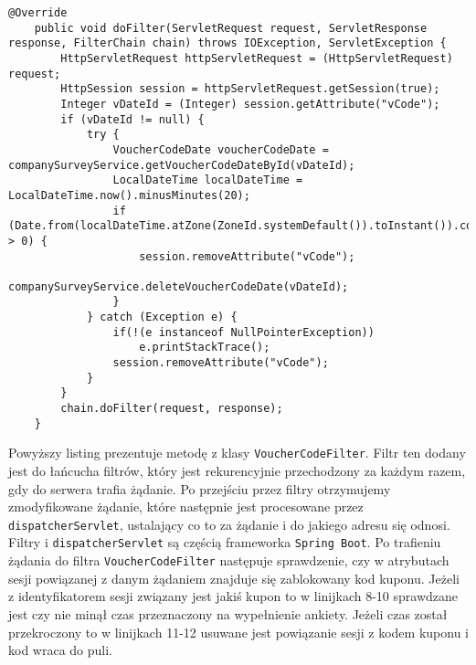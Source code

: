 \clearpage
\begin{center}
\begin{lstlisting}[caption={Listing kodu zwalniającego kod kuponu po wygaśnięciu sesji},captionpos=b]
@Override
    public void doFilter(ServletRequest request, ServletResponse response, FilterChain chain) throws IOException, ServletException {
        HttpServletRequest httpServletRequest = (HttpServletRequest) request;
        HttpSession session = httpServletRequest.getSession(true);
        Integer vDateId = (Integer) session.getAttribute("vCode");
        if (vDateId != null) {
            try {
                VoucherCodeDate voucherCodeDate = companySurveyService.getVoucherCodeDateById(vDateId);
                LocalDateTime localDateTime = LocalDateTime.now().minusMinutes(20);
                if (Date.from(localDateTime.atZone(ZoneId.systemDefault()).toInstant()).compareTo(voucherCodeDate.getUseDate()) > 0) {
                    session.removeAttribute("vCode");
                    companySurveyService.deleteVoucherCodeDate(vDateId);
                }
            } catch (Exception e) {
                if(!(e instanceof NullPointerException))
                    e.printStackTrace();
                session.removeAttribute("vCode");
            }
        }
        chain.doFilter(request, response);
    }
\end{lstlisting}
\end{center}

Powyższy listing prezentuje metodę z klasy \texttt{VoucherCodeFilter}. Filtr ten dodany jest do łańcucha filtrów, który jest rekurencyjnie przechodzony za każdym razem, gdy do serwera trafia żądanie. Po przejściu przez filtry otrzymujemy zmodyfikowane żądanie, które następnie jest procesowane przez \texttt{dispatcherServlet}, ustalający co to za żądanie i do jakiego adresu się odnosi. Filtry i \texttt{dispatcherServlet} są częścią frameworka \texttt{Spring Boot}. Po trafieniu żądania do filtra \texttt{VoucherCodeFilter} następuje sprawdzenie, czy w atrybutach sesji powiązanej z danym żądaniem znajduje się zablokowany kod kuponu. Jeżeli z identyfikatorem sesji związany jest jakiś kupon to w linijkach 8-10 sprawdzane jest czy nie minął czas przeznaczony na wypełnienie ankiety. Jeżeli czas został przekroczony to w linijkach 11-12 usuwane jest powiązanie sesji z kodem kuponu i kod wraca do puli.

